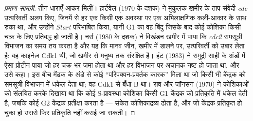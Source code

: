\begin{proof}[प्रमाण-सामग्री]
तीन धाराएँ आकर मिलीं। हार्टवेल (1970 के दशक) ने मुकुलक खमीर के
ताप-संवेदी \emph{cdc} उत्परिवर्ती अलग किए, जिनमें से हर एक किसी एक
अवस्था पर एक अभिलाक्षणिक कली-आकार के साथ रुका था, और उन्होंने
\emph{Start} परिभाषित किया, यानी G1 का वह बिंदु जिसके बाद कोई कोशिका
किसी चक्र के लिए प्रतिबद्ध हो जाती है। नर्स (1980 के दशक) ने विखंडन
खमीर में पाया कि \emph{cdc2} समसूत्री विभाजन का समय तय करता है और यह
कि मानव जीन, खमीर में डालने पर, उत्परिवर्ती को उबार लेता है: वह काइनेज़
Cdk1 थी, जो खमीर से मनुष्य तक संरक्षित है। हंट (1983) ने समुद्री साही
के अंडों में ऐसा प्रोटीन पाया जो हर चक्र भर जमा होता था और हर विभाजन पर
अचानक नष्ट हो जाता था, और उसे  कहा। इस बीच मेंढक के अंडे से कोई
``परिपक्वन-प्रवर्तक कारक'' मिला था जो किसी भी केंद्रक को समसूत्री
विभाजन में धकेल देता था; वह Cdk1 से बँधा  B था। राव और जॉनसन
(1970) ने कोशिकाओं को संलयित करके दिखाया था कि कोई S-प्रावस्था कोशिका
किसी G1 केंद्रक को प्रतिकृति में धकेल देती है, जबकि कोई G2 केंद्रक
प्रतीक्षा करता है --- संकेत कोशिकाद्रव्य ढोता है, और जो केंद्रक प्रतिकृत
हो चुका हो उससे फिर प्रतिकृति नहीं कराई जा सकती।
\end{proof}

